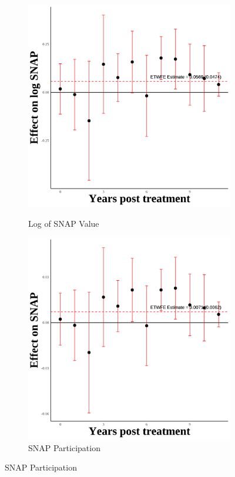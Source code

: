 \documentclass[12pt,english]{article}
\begin{document}
\begin{figure}[H]
  \begin{subfigure}[b]{0.3\textwidth}
    \centering
    \caption{Log of SNAP Value}
    \includegraphics[width=\linewidth]{figures/plot76-ln_snap_event_study-third-three.png}
    \label{fig:ln-snap-third-three}
  \end{subfigure}
  \hfill
  \begin{subfigure}[b]{0.3\textwidth}
    \centering
    \caption{SNAP Participation}
    \includegraphics[width=\linewidth]{figures/plot77-snap_event_study-third-three.png}

\end{subfigure}
\end{figure}
\end{document}
